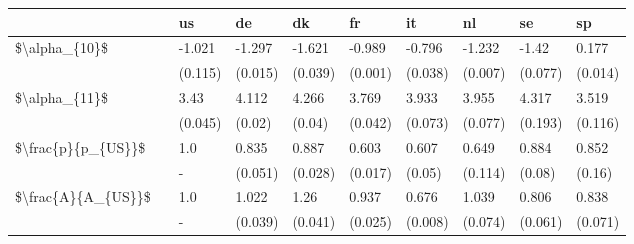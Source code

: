 \begin{tabular}{llllllllll}
\toprule
                   & {} &       us &       de &       dk &       fr &       it &       nl &       se &       sp \\
\midrule
\$\textbackslash alpha\_\{10\}\$ & {} &   -1.021 &   -1.297 &   -1.621 &   -0.989 &   -0.796 &   -1.232 &    -1.42 &    0.177 \\
                   & {} &  (0.115) &  (0.015) &  (0.039) &  (0.001) &  (0.038) &  (0.007) &  (0.077) &  (0.014) \\
\$\textbackslash alpha\_\{11\}\$ & {} &     3.43 &    4.112 &    4.266 &    3.769 &    3.933 &    3.955 &    4.317 &    3.519 \\
                   & {} &  (0.045) &   (0.02) &   (0.04) &  (0.042) &  (0.073) &  (0.077) &  (0.193) &  (0.116) \\
\$\textbackslash frac\{p\}\{p\_\{US\}\}\$ & {} &      1.0 &    0.835 &    0.887 &    0.603 &    0.607 &    0.649 &    0.884 &    0.852 \\
                   & {} &        - &  (0.051) &  (0.028) &  (0.017) &   (0.05) &  (0.114) &   (0.08) &   (0.16) \\
\$\textbackslash frac\{A\}\{A\_\{US\}\}\$ & {} &      1.0 &    1.022 &     1.26 &    0.937 &    0.676 &    1.039 &    0.806 &    0.838 \\
                   & {} &        - &  (0.039) &  (0.041) &  (0.025) &  (0.008) &  (0.074) &  (0.061) &  (0.071) \\
\bottomrule
\end{tabular}
